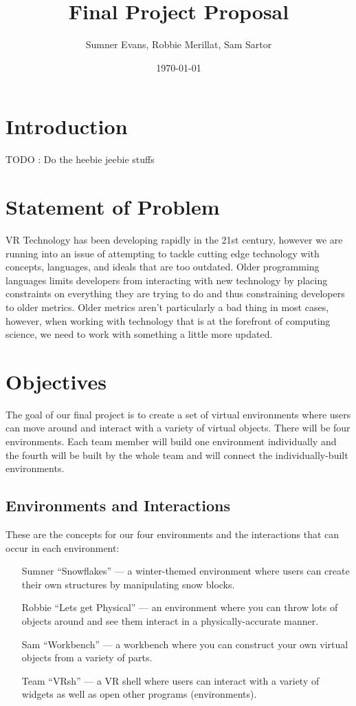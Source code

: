 \documentclass[titlepage,12pt]{article}
\title{Final Project Proposal}
\author{Sumner Evans, Robbie Merillat, Sam Sartor}
\date{\today}
\begin{document}
\maketitle

\section{Introduction}

TODO : Do the heebie jeebie stuffs

\section{Statement of Problem}

VR Technology has been developing rapidly in the 21st century, however we are 
running into an issue of attempting to tackle cutting edge technology with 
concepts, languages, and ideals that are too outdated. Older programming 
languages limits developers from interacting with new technology by placing 
constraints on everything they are trying to do and thus constraining 
developers to older metrics. Older metrics aren't particularly a bad thing 
in most cases, however, when working with technology that is at the forefront
of computing science, we need to work with something a little more updated.

\section{Objectives}

The goal of our final project is to create a set of virtual environments where
users can move around and interact with a variety of virtual objects. There will
be four environments. Each team member will build one environment individually
and the fourth will be built by the whole team and will connect the
individually-built environments.

\subsection{Environments and Interactions}
These are the concepts for our four environments and the interactions that can
occur in each environment:

\begin{enumerate}[leftmargin=*]
    \item [Sumner] ``Snowflakes'' --- a winter-themed environment where users
        can create their own structures by manipulating snow blocks.
    \item [Robbie] ``Lets get Physical'' --- an environment where you can throw
        lots of objects around and see them interact in a physically-accurate
        manner.
    \item [Sam] ``Workbench'' --- a workbench where you can construct your own
        virtual objects from a variety of parts.
    \item [Team] ``VRsh'' --- a VR shell where users can interact with a variety
        of widgets as well as open other programs (environments).
\end{enumerate}
\end{document}
